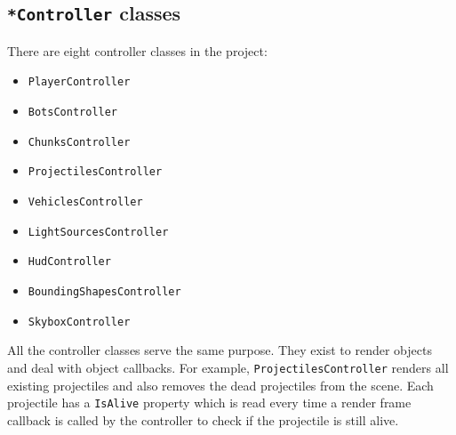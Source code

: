 \subsection{\texttt{*Controller} classes}
There are eight controller classes in the project:

\begin{itemize}
    \item  \texttt{PlayerController}
    \item \texttt{BotsController}
    \item \texttt{ChunksController}
    \item \texttt{ProjectilesController}
    \item \texttt{VehiclesController}
    \item \texttt{LightSourcesController}
    \item \texttt{HudController}
    \item \texttt{BoundingShapesController}
    \item \texttt{SkyboxController}
\end{itemize}

All the controller classes serve the same purpose.
They exist to render objects and deal with object callbacks.
For example, \texttt{ProjectilesController} renders all existing projectiles and also removes the dead projectiles from the scene.
Each projectile has a \texttt{IsAlive} property which is read every time a render frame callback is called by the controller to check if the projectile is still alive.
